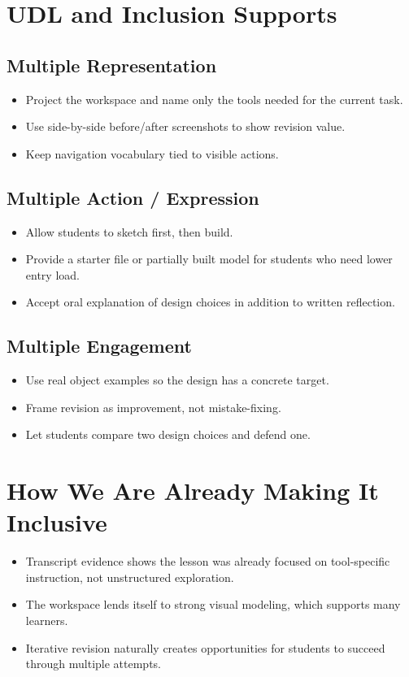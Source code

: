 \documentclass[11pt]{article}
\begin{document}
\section*{UDL and Inclusion Supports}
\subsection*{Multiple Representation}
\begin{itemize}[leftmargin=*]
\item Project the workspace and name only the tools needed for the current task.
\item Use side-by-side before/after screenshots to show revision value.
\item Keep navigation vocabulary tied to visible actions.
\end{itemize}

\subsection*{Multiple Action / Expression}
\begin{itemize}[leftmargin=*]
\item Allow students to sketch first, then build.
\item Provide a starter file or partially built model for students who need lower entry load.
\item Accept oral explanation of design choices in addition to written reflection.
\end{itemize}

\subsection*{Multiple Engagement}
\begin{itemize}[leftmargin=*]
\item Use real object examples so the design has a concrete target.
\item Frame revision as improvement, not mistake-fixing.
\item Let students compare two design choices and defend one.
\end{itemize}

\section*{How We Are Already Making It Inclusive}
\begin{itemize}[leftmargin=*]
\item Transcript evidence shows the lesson was already focused on tool-specific instruction, not unstructured exploration.
\item The workspace lends itself to strong visual modeling, which supports many learners.
\item Iterative revision naturally creates opportunities for students to succeed through multiple attempts.
\end{itemize}
\end{document}
